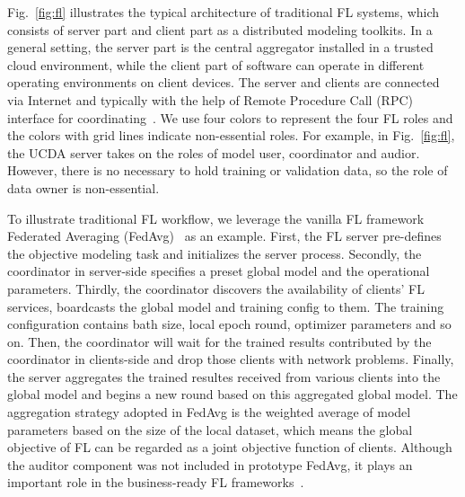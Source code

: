 Fig.~\ref{fig:fl} illustrates the typical architecture of traditional FL systems, which consists of server part and client part as a distributed modeling toolkits. 
In a general setting, the server part is the central aggregator installed in a trusted cloud environment, while the client part of software can operate in different operating environments on client devices. 
The server and clients are connected via Internet and typically with the help of Remote Procedure Call (RPC) interface for coordinating~\cite{zhang2022felicitas, abadi2016tensorflow, liu2021fate, beutel2020flower, he2020fedml, foley2022openfl}.
We use four colors to represent the four FL roles and the colors with grid lines indicate non-essential roles.
For example, in Fig.~\ref{fig:fl}, the UCDA server takes on the roles of model user, coordinator and audior. 
However, there is no necessary to hold training or validation data, so the role of data owner is non-essential.

To illustrate traditional FL workflow, we leverage the vanilla FL framework Federated Averaging (FedAvg)~\cite{mcmahan2017communication, bonawitz2019towards} as an example.
First, the FL server pre-defines the objective modeling task and initializes the server process.
Secondly,  the coordinator in server-side specifies a preset global model and the operational parameters.
Thirdly, the coordinator discovers the availability of clients' FL services, boardcasts the global model and training config to them. The training configuration contains bath size, local epoch round, optimizer parameters and so on. Then, the coordinator will wait for the trained results contributed by the coordinator in clients-side and drop those clients with network problems.
Finally, the server aggregates the trained resultes received from various clients into the global model and begins a new round based on this aggregated global model. 
The aggregation strategy adopted in FedAvg is the weighted average of model parameters based on the size of the local dataset, which means the global objective of FL can be regarded as a joint objective function of clients.
Although the auditor component was not included in prototype FedAvg, it plays an important role in the business-ready FL frameworks~\cite{liu2021fate,roth2022nvidia, ziller2021pysyft}.


